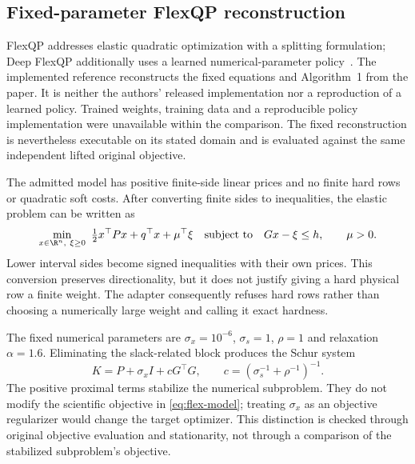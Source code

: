 \subsection{Fixed-parameter FlexQP reconstruction}\label{sec:flex}
FlexQP addresses elastic quadratic optimization with a splitting formulation;
Deep FlexQP additionally uses a learned numerical-parameter policy~\cite{flex}.
The implemented reference reconstructs the fixed equations and Algorithm~1 from
the paper. It is neither the authors' released implementation nor a reproduction
of a learned policy. Trained weights, training data and a reproducible policy
implementation were unavailable within the comparison. The fixed reconstruction
is nevertheless executable on its stated domain and is evaluated against the
same independent lifted original objective.

The admitted model has positive finite-side linear prices and no finite hard
rows or quadratic soft costs. After converting finite sides to inequalities,
the elastic problem can be written as
\begin{equation}\label{eq:flex-model}
 \min_{x\in\R^n,\ \xi\geq0}\ \tfrac12x^\top P x+q^\top x+\mu^\top\xi
 \quad\text{subject to}\quad Gx-\xi\leq h,\qquad \mu>0.
\end{equation}
Lower interval sides become signed inequalities with their own prices. This
conversion preserves directionality, but it does not justify giving a hard
physical row a finite weight. The adapter consequently refuses hard rows rather
than choosing a numerically large weight and calling it exact hardness.

The fixed numerical parameters are $\sigma_x=10^{-6}$, $\sigma_s=1$, $\rho=1$
and relaxation $\alpha=1.6$. Eliminating the slack-related block produces the
Schur system
\begin{equation}\label{eq:flex-system}
 K=P+\sigma_x I+cG^\top G,\qquad
 c=(\sigma_s^{-1}+\rho^{-1})^{-1}.
\end{equation}
The positive proximal terms stabilize the numerical subproblem. They do not
modify the scientific objective in \eqref{eq:flex-model}; treating $\sigma_x$
as an objective regularizer would change the target optimizer. This distinction
is checked through original objective evaluation and stationarity, not through
a comparison of the stabilized subproblem's objective.

